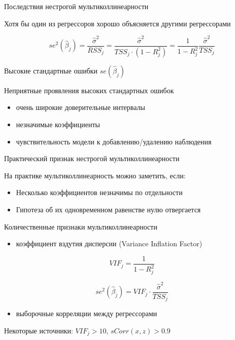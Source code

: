 \documentclass[ignorenonframetext,]{beamer}
\begin{document}
\begin{frame}{Последствия нестрогой мультиколлинеарности}

Хотя бы один из регрессоров хорошо объясняется другими регрессорами

\[
se^2(\hat{\beta}_j)=\frac{\hat{\sigma}^2}{RSS_j}=\frac{\hat{\sigma}^2}{TSS_j\cdot (1-R^2_j)}=
\frac{1}{1-R^2_j}\frac{\hat{\sigma}^2}{TSS_j}
\]

Высокие стандартные ошибки \(se(\hat{\beta}_j)\)

\end{frame}

\begin{frame}{Неприятные проявления высоких стандартных ошибок}

\begin{itemize}
\itemsep1pt\parskip0pt
\item
  очень широкие доверительные интервалы
\item
  незначимые коэффициенты
\item
  чувствительность модели к добавлению/удалению наблюдения
\end{itemize}

\end{frame}

\begin{frame}{Практический признак нестрогой мультиколлинеарности}

На практике мультиколлинеарность можно заметить, если:

\begin{itemize}
\item
  Несколько коэффициентов незначимы по отдельности
\item
  Гипотеза об их одновременном равенстве нулю отвергается
\end{itemize}

\end{frame}

\begin{frame}{Количественные признаки мультиколлинеарности}

\begin{itemize}
\itemsep1pt\parskip0pt
\item
  коэффициент вздутия дисперсии (Variance Inflation Factor)
\end{itemize}

\[
VIF_j=\frac{1}{1-R^2_j}
\]

\[
se^2(\hat{\beta}_j)=VIF_j \cdot \frac{\hat{\sigma}^2}{TSS_j}
\]

\begin{itemize}
\itemsep1pt\parskip0pt
\item
  выборочные корреляции между регрессорами
\end{itemize}

Некоторые источники: \(VIF_j > 10\), \(sCorr(x,z)>0.9\)

\end{frame}
\end{document}
